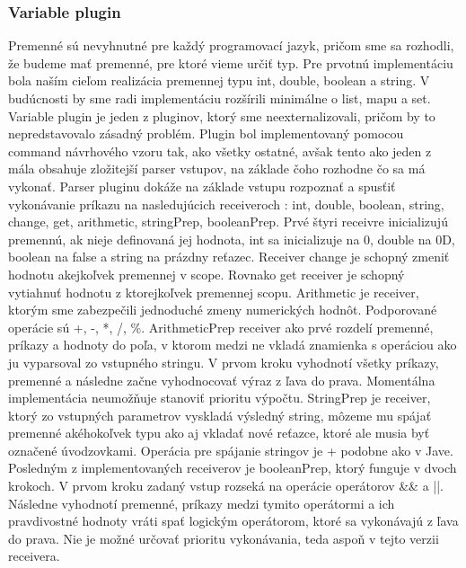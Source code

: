 {\subsubsection{Variable plugin}
\indent Premenné sú nevyhnutné pre každý programovací jazyk, pričom sme sa rozhodli, že budeme mať premenné, pre ktoré vieme určiť typ. Pre prvotnú implementáciu bola naším cieľom realizácia premennej typu int, double, boolean a string. V budúcnosti by sme radi implementáciu rozšírili minimálne o list, mapu a set. Variable plugin je jeden z pluginov, ktorý sme neexternalizovali, pričom by to nepredstavovalo zásadný problém. Plugin bol implementovaný pomocou command návrhového vzoru tak, ako všetky ostatné, avšak tento ako jeden z mála obsahuje zložitejší parser vstupov, na základe čoho rozhodne čo sa má vykonať. 
\newline 
\indent Parser pluginu dokáže na základe vstupu rozpoznať a spusťiť vykonávanie príkazu na nasledujúcich receiveroch : int, double, boolean, string, change, get, arithmetic, stringPrep, booleanPrep. 
\newline 
\indent Prvé štyri receivre inicializujú premennú, ak nieje definovaná jej hodnota, int sa inicializuje na 0, double na 0D, boolean na false a string na prázdny reťazec. 
\newline 
\indent Receiver change je schopný zmeniť hodnotu akejkoľvek premennej v scope. Rovnako get receiver je schopný vytiahnuť hodnotu z ktorejkoľvek premennej scopu. 
\newline 
\indent Arithmetic je receiver, ktorým sme zabezpečili jednoduché zmeny numerických hodnôt. Podporované operácie sú +, -, *, /, \%. ArithmeticPrep receiver ako prvé rozdelí premenné, príkazy a hodnoty do poľa, v ktorom medzi ne vkladá znamienka s operáciou ako ju vyparsoval zo vstupného stringu. V prvom kroku vyhodnotí všetky príkazy, premenné a následne začne vyhodnocovať výraz z ľava do prava. Momentálna implementácia neumožňuje stanoviť prioritu výpočtu. 
\newline 
\indent StringPrep je receiver, ktorý zo vstupných parametrov vyskladá výsledný string, môzeme mu spájať premenné akéhokoľvek typu ako aj vkladať nové reťazce, ktoré ale musia byť označené úvodzovkami. Operácia pre spájanie stringov je + podobne ako v Jave. 
\newline 
\indent Posledným z implementovaných receiverov je booleanPrep, ktorý funguje v dvoch krokoch. V prvom kroku zadaný vstup rozseká na operácie operátorov \&\& a ||. Následne vyhodnotí premenné, príkazy medzi tymito operátormi a ich pravdivostné hodnoty vráti spať logickým operátorom, ktoré sa vykonávajú z ľava do prava. Nie je možné určovať prioritu vykonávania, teda aspoň v tejto verzii receivera.
}
